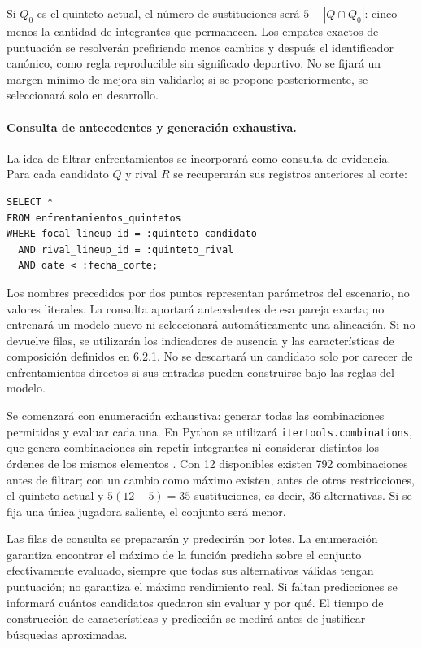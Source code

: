 Si $Q_0$ es el quinteto actual, el número de sustituciones será $5-|Q\cap Q_0|$: cinco menos la cantidad de integrantes que permanecen. Los empates exactos de puntuación se resolverán prefiriendo menos cambios y después el identificador canónico, como regla reproducible sin significado deportivo. No se fijará un margen mínimo de mejora sin validarlo; si se propone posteriormente, se seleccionará solo en desarrollo.

\paragraph*{Consulta de antecedentes y generación exhaustiva.}
La idea de filtrar enfrentamientos se incorporará como consulta de evidencia. Para cada candidato $Q$ y rival $R$ se recuperarán sus registros anteriores al corte:
\begin{lstlisting}[style=sqlstyle]
SELECT *
FROM enfrentamientos_quintetos
WHERE focal_lineup_id = :quinteto_candidato
  AND rival_lineup_id = :quinteto_rival
  AND date < :fecha_corte;
\end{lstlisting}
Los nombres precedidos por dos puntos representan parámetros del escenario, no valores literales. La consulta aportará antecedentes de esa pareja exacta; no entrenará un modelo nuevo ni seleccionará automáticamente una alineación. Si no devuelve filas, se utilizarán los indicadores de ausencia y las características de composición definidos en 6.2.1. No se descartará un candidato solo por carecer de enfrentamientos directos si sus entradas pueden construirse bajo las reglas del modelo.

Se comenzará con enumeración exhaustiva: generar todas las combinaciones permitidas y evaluar cada una. En Python se utilizará \texttt{itertools.combinations}, que genera combinaciones sin repetir integrantes ni considerar distintos los órdenes de los mismos elementos \cite{pythonCombinationsFase2}. Con 12 disponibles existen 792 combinaciones antes de filtrar; con un cambio como máximo existen, antes de otras restricciones, el quinteto actual y $5(12-5)=35$ sustituciones, es decir, 36 alternativas. Si se fija una única jugadora saliente, el conjunto será menor.

Las filas de consulta se prepararán y predecirán por lotes. La enumeración garantiza encontrar el máximo de la función predicha sobre el conjunto efectivamente evaluado, siempre que todas sus alternativas válidas tengan puntuación; no garantiza el máximo rendimiento real. Si faltan predicciones se informará cuántos candidatos quedaron sin evaluar y por qué. El tiempo de construcción de características y predicción se medirá antes de justificar búsquedas aproximadas.

